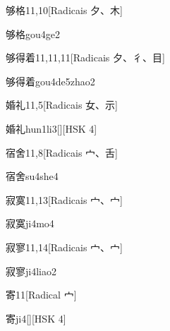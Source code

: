 \begin{entry}{够格}{11,10}[Radicais ⼣、⽊]
  \begin{phonetics}{够格}{gou4ge2}
  \end{phonetics}
\end{entry}

\begin{entry}{够得着}{11,11,11}[Radicais ⼣、⼻、⽬]
  \begin{phonetics}{够得着}{gou4de5zhao2}
  \end{phonetics}
\end{entry}

\begin{entry}{婚礼}{11,5}[Radicais ⼥、⽰]
  \begin{phonetics}{婚礼}{hun1li3}[][HSK 4]
  \end{phonetics}
\end{entry}

\begin{entry}{宿舍}{11,8}[Radicais ⼧、⾆]
  \begin{phonetics}{宿舍}{su4she4}
  \end{phonetics}
\end{entry}

\begin{entry}{寂寞}{11,13}[Radicais ⼧、⼧]
  \begin{phonetics}{寂寞}{ji4mo4}
  \end{phonetics}
\end{entry}

\begin{entry}{寂寥}{11,14}[Radicais ⼧、⼧]
  \begin{phonetics}{寂寥}{ji4liao2}
  \end{phonetics}
\end{entry}

\begin{entry}{寄}{11}[Radical ⼧]
  \begin{phonetics}{寄}{ji4}[][HSK 4]
  \end{phonetics}
\end{entry}

